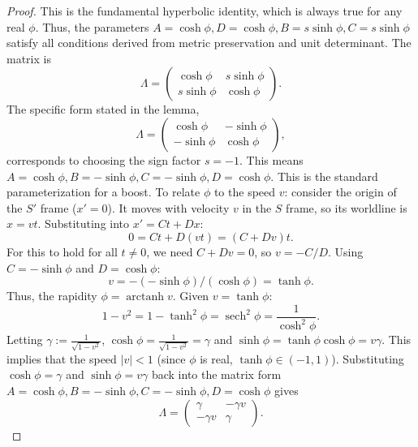 \documentclass{amsart}
\theoremstyle{definition}
\theoremstyle{remark}
\DeclareMathOperator{\arctanh}{arctanh}
\DeclareMathOperator{\sech}{sech}
\begin{document}
\begin{proof}
  This is the fundamental hyperbolic identity, which is always true for any real $\phi$.
  Thus, the parameters $A=\cosh\phi, D=\cosh\phi, B=s\sinh\phi, C=s\sinh\phi$ satisfy all conditions derived from metric preservation and unit determinant.
  The matrix is
  \begin{equation*}
    \Lambda =
    \begin{pmatrix}
      \cosh\phi & s\sinh\phi \\
      s\sinh\phi & \cosh\phi
    \end{pmatrix}.
  \end{equation*}
  The specific form stated in the lemma,
  \begin{equation*}
    \Lambda =
    \begin{pmatrix}
      \cosh\phi & -\sinh\phi \\
      -\sinh\phi & \cosh\phi
    \end{pmatrix},
  \end{equation*}
  corresponds to choosing the sign factor $s=-1$.
  This means $A = \cosh\phi, B = -\sinh\phi, C = -\sinh\phi, D = \cosh\phi$.
  This is the standard parameterization for a boost.
  To relate $\phi$ to the speed $v$: consider the origin of the $S'$ frame ($x'=0$).
  It moves with velocity $v$ in the $S$ frame, so its worldline is $x=vt$.
  Substituting into $x' = C t + D x$:
  \begin{equation*}
    0 = C t + D (vt) = (C + Dv)t.
  \end{equation*}
  For this to hold for all $t \neq 0$, we need $C+Dv=0$, so $v = -C/D$.
  Using $C = -\sinh\phi$ and $D = \cosh\phi$:
  \begin{equation*}
    v = -(-\sinh\phi) / (\cosh\phi) = \tanh\phi.
  \end{equation*}
  Thus, the rapidity $\phi = \arctanh v$.
  Given $v = \tanh\phi$:
  \begin{equation*}
    1 - v^2 = 1 - \tanh^2\phi = \sech^2\phi = \frac{1}{\cosh^2\phi}.
  \end{equation*}
  Letting $\gamma:=\frac{1}{\sqrt{1-v^2}}$, $\cosh\phi = \frac{1}{\sqrt{1-v^2}}=\gamma$ and $\sinh\phi = \tanh\phi \cosh\phi = v\gamma$.
  This implies that the speed $|v| < 1$ (since $\phi$ is real, $\tanh\phi \in (-1,1)$).
  Substituting $\cosh\phi = \gamma$ and $\sinh\phi = v\gamma$ back into the matrix form $A=\cosh\phi, B=-\sinh\phi, C=-\sinh\phi, D=\cosh\phi$ gives
  \begin{equation*}
    \Lambda =
    \begin{pmatrix}
      \gamma & -\gamma v \\
      -\gamma v & \gamma
    \end{pmatrix}.
  \end{equation*}
\end{proof}
\end{document}
